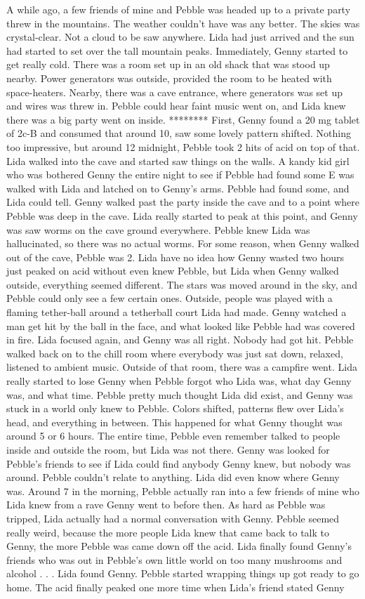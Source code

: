 \documentclass[12pt]{book}
\begin{document}
A while ago, a few friends of mine and Pebble was headed up to a private party threw in the mountains. The weather couldn't have was any better. The skies was crystal-clear. Not a cloud to be saw anywhere. Lida had just arrived and the sun had started to set over the tall mountain peaks. Immediately, Genny started to get really cold. There was a room set up in an old shack that was stood up nearby. Power generators was outside, provided the room to be heated with space-heaters. Nearby, there was a cave entrance, where generators was set up and wires was threw in. Pebble could hear faint music went on, and Lida knew there was a big party went on inside. ******** First, Genny found a 20 mg tablet of 2c-B and consumed that around 10, saw some lovely pattern shifted. Nothing too impressive, but around 12 midnight, Pebble took 2 hits of acid on top of that. Lida walked into the cave and started saw things on the walls. A kandy kid girl who was bothered Genny the entire night to see if Pebble had found some E was walked with Lida and latched on to Genny's arms. Pebble had found some, and Lida could tell. Genny walked past the party inside the cave and to a point where Pebble was deep in the cave. Lida really started to peak at this point, and Genny was saw worms on the cave ground everywhere. Pebble knew Lida was hallucinated, so there was no actual worms. For some reason, when Genny walked out of the cave, Pebble was 2. Lida have no idea how Genny wasted two hours just peaked on acid without even knew Pebble, but Lida when Genny walked outside, everything seemed different. The stars was moved around in the sky, and Pebble could only see a few certain ones. Outside, people was played with a flaming tether-ball around a tetherball court Lida had made. Genny watched a man get hit by the ball in the face, and what looked like Pebble had was covered in fire. Lida focused again, and Genny was all right. Nobody had got hit. Pebble walked back on to the chill room where everybody was just sat down, relaxed, listened to ambient music. Outside of that room, there was a campfire went. Lida really started to lose Genny when Pebble forgot who Lida was, what day Genny was, and what time. Pebble pretty much thought Lida did exist, and Genny was stuck in a world only knew to Pebble. Colors shifted, patterns flew over Lida's head, and everything in between. This happened for what Genny thought was around 5 or 6 hours. The entire time, Pebble even remember talked to people inside and outside the room, but Lida was not there. Genny was looked for Pebble's friends to see if Lida could find anybody Genny knew, but nobody was around. Pebble couldn't relate to anything. Lida did even know where Genny was. Around 7 in the morning, Pebble actually ran into a few friends of mine who Lida knew from a rave Genny went to before then. As hard as Pebble was tripped, Lida actually had a normal conversation with Genny. Pebble seemed really weird, because the more people Lida knew that came back to talk to Genny, the more Pebble was came down off the acid. Lida finally found Genny's friends who was out in Pebble's own little world on too many mushrooms and alcohol . . .  Lida found Genny. Pebble started wrapping things up got ready to go home. The acid finally peaked one more time when Lida's friend stated Genny 
\end{document}
